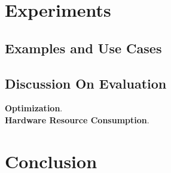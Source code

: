 \documentclass[letterpaper,twocolumn,10pt]{article}
\begin{document}
\section{Experiments}

\subsection{Examples and Use Cases}
\subsection{Discussion On Evaluation}
\textbf{Optimization}. \\
\textbf{Hardware Resource Consumption}. \\

\section{Conclusion}




\clearpage




\appendix
\end{document}
